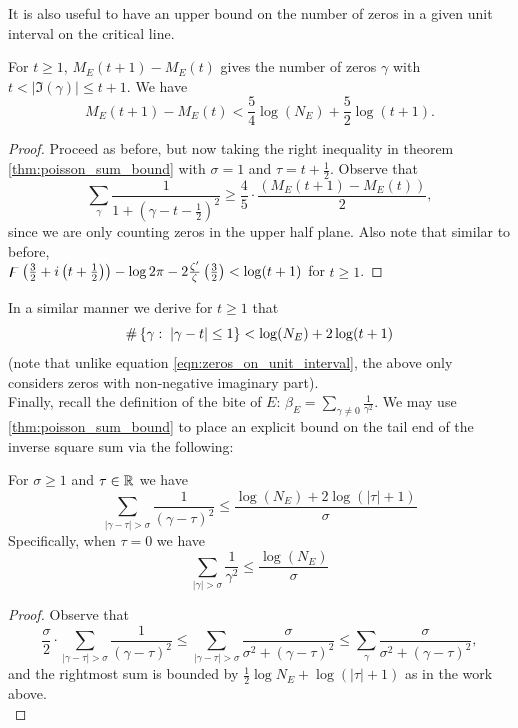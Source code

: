 It is also useful to have an upper bound on the number of zeros in a given unit interval on the critical line.
\begin{corollary}\label{cor:zeros_on_unit_interval}
For $t\ge1$, $M_E(t+1)-M_E(t)$ gives the number of zeros $\gamma$ with $t < |\Im(\gamma)| \le t+1$. We have
\begin{equation}\label{eqn:zeros_on_unit_interval}
M_E(t+1)-M_E(t) < \frac{5}{4}\log(N_E) + \frac{5}{2}\log(t+1).
\end{equation}
\end{corollary}
\begin{proof}
Proceed as before, but now taking the right inequality in theorem \ref{thm:poisson_sum_bound} with $\sigma = 1$ and $\tau=t+\frac{1}{2}$. Observe that
\begin{equation*}
\sum_{\gamma}\frac{1}{1+\left(\gamma-t-\frac{1}{2}\right)^2} \ge \frac{4}{5}\cdot\frac{\left(M_E(t+1)-M_E(t)\right)}{2},
\end{equation*}
since we are only counting zeros in the upper half plane. Also note that similar to before,\\
$\digamma\left(\frac{3}{2}+i\left(t+\frac{1}{2}\right)\right) - \log 2\pi - 2\frac{\zeta^{\prime}}{\zeta}\left(\frac{3}{2}\right) < \log(t+1)$ for $t \ge 1$.
\end{proof}
In a similar manner we derive for $t \ge 1$ that
\begin{equation}\label{eqn:zeros_in_unit_ball}
\#\left\{\gamma:\;|\gamma-t|\le 1\right\} < \log(N_E) + 2\log(t+1)
\end{equation}
(note that unlike equation \ref{eqn:zeros_on_unit_interval}, the above only considers zeros with non-negative imaginary part). \\

Finally, recall the definition of the bite of $E$: $\beta_E = \sum_{\gamma \ne 0} \frac{1}{\gamma^2}$. We may use \ref{thm:poisson_sum_bound} to place an explicit bound on the tail end of the inverse square sum via the following:
\begin{corollary}\label{cor:sum_tail_bound}
For $\sigma \ge 1$ and $\tau \in \mathbb{R}$ we have
\begin{equation}
\sum_{|\gamma-\tau|>\sigma} \frac{1}{(\gamma-\tau)^2} \le \frac{\log(N_E) + 2\log(|\tau|+1)}{\sigma}
\end{equation}
Specifically, when $\tau=0$ we have
\begin{equation}
\sum_{|\gamma|>\sigma} \frac{1}{\gamma^2} \le \frac{\log(N_E)}{\sigma}
\end{equation}
\end{corollary}
\begin{proof}
Observe that
\begin{equation*}
\frac{\sigma}{2}\cdot\sum_{|\gamma-\tau|>\sigma} \frac{1}{(\gamma-\tau)^2} \le \sum_{|\gamma-\tau|>\sigma} \frac{\sigma}{\sigma^2+(\gamma-\tau)^2} \le\sum_{\gamma} \frac{\sigma}{\sigma^2+(\gamma-\tau)^2},
\end{equation*}
and the rightmost sum is bounded by $\frac{1}{2}\log N_E + \log(|\tau|+1)$ as in the work above. \\
\end{proof}

